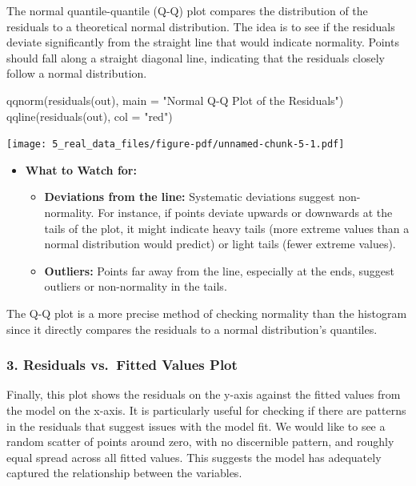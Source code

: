 \documentclass[
  letterpaper,
  DIV=11,
  numbers=noendperiod]{scrreprt}
\newenvironment{Shaded}{\begin{snugshade}}{\end{snugshade}}
\newcommand{\AttributeTok}[1]{\textcolor[rgb]{0.40,0.45,0.13}{#1}}
\newcommand{\FunctionTok}[1]{\textcolor[rgb]{0.28,0.35,0.67}{#1}}
\newcommand{\NormalTok}[1]{\textcolor[rgb]{0.00,0.23,0.31}{#1}}
\newcommand{\StringTok}[1]{\textcolor[rgb]{0.13,0.47,0.30}{#1}}
\providecommand{\tightlist}{%
  \setlength{\itemsep}{0pt}\setlength{\parskip}{0pt}}\usepackage{longtable,booktabs,array}
\begin{document}
The normal quantile-quantile (Q-Q) plot compares the distribution of the
residuals to a theoretical normal distribution. The idea is to see if
the residuals deviate significantly from the straight line that would
indicate normality. Points should fall along a straight diagonal line,
indicating that the residuals closely follow a normal distribution.

\begin{Shaded}
\begin{Highlighting}[]
\FunctionTok{qqnorm}\NormalTok{(}\FunctionTok{residuals}\NormalTok{(out), }\AttributeTok{main =} \StringTok{"Normal Q{-}Q Plot of the Residuals"}\NormalTok{)}
\FunctionTok{qqline}\NormalTok{(}\FunctionTok{residuals}\NormalTok{(out), }\AttributeTok{col =} \StringTok{"red"}\NormalTok{)}
\end{Highlighting}
\end{Shaded}

\texttt{[image: 5\_real\_data\_files/figure-pdf/unnamed-chunk-5-1.pdf]}

\begin{itemize}
\tightlist
\item
  \textbf{What to Watch for:}

  \begin{itemize}
  \tightlist
  \item
    \textbf{Deviations from the line:} Systematic deviations suggest
    non-normality. For instance, if points deviate upwards or downwards
    at the tails of the plot, it might indicate heavy tails (more
    extreme values than a normal distribution would predict) or light
    tails (fewer extreme values).
  \item
    \textbf{Outliers:} Points far away from the line, especially at the
    ends, suggest outliers or non-normality in the tails.
  \end{itemize}
\end{itemize}

The Q-Q plot is a more precise method of checking normality than the
histogram since it directly compares the residuals to a normal
distribution's quantiles.

\subsubsection{\texorpdfstring{3. \textbf{Residuals vs.~Fitted Values
Plot}}{3. Residuals vs.~Fitted Values Plot}}\label{residuals-vs.-fitted-values-plot}

Finally, this plot shows the residuals on the y-axis against the fitted
values from the model on the x-axis. It is particularly useful for
checking if there are patterns in the residuals that suggest issues with
the model fit. We would like to see a random scatter of points around
zero, with no discernible pattern, and roughly equal spread across all
fitted values. This suggests the model has adequately captured the
relationship between the variables.
\end{document}
